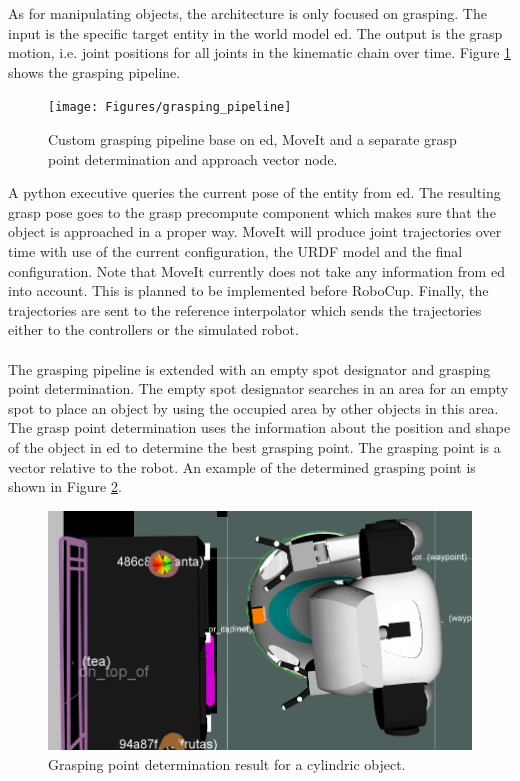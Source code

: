As for manipulating objects, the architecture is only focused on grasping. The input is the specific target entity in the world model \acrshort{ed}. The output is the grasp motion, i.e. joint positions for all joints in the kinematic chain over time. Figure \ref{fig:grasping_pipeline} shows the grasping pipeline.
\begin{figure}[h]
    \centering
	\texttt{[image: Figures/grasping\_pipeline]}
	\caption{Custom grasping pipeline base on \acrshort{ed}, MoveIt and a separate grasp point determination and approach vector node.}
	\label{fig:grasping_pipeline}
\end{figure}
A python executive queries the current pose of the entity from \acrshort{ed}. The resulting grasp pose goes to the grasp precompute component which makes sure that the object is approached in a proper way. MoveIt will produce joint trajectories over time with use of the current configuration, the URDF model and the final configuration. Note that MoveIt currently does not take any information from \acrshort{ed} into account. This is planned to be implemented before RoboCup. Finally, the trajectories are sent to the reference interpolator which sends the trajectories either to the controllers or the simulated robot.
\\\\
The grasping pipeline is extended with an empty spot designator and grasping point determination. The empty spot designator searches in an area for an empty spot to place an object by using the occupied area by other objects in this area.
\\
The grasp point determination uses the information about the position and shape of the object in \acrshort{ed} to determine the best grasping point. The grasping point is a vector relative to the robot. An example of the determined grasping point is shown in Figure \ref{fig:grasping_point_determination}.
 \begin{figure}[h]
    \centering
	\includegraphics[width = 0.8\linewidth]{Figures/grasp_point_determination}
	\caption{Grasping point determination result for a cylindric object.}
	\label{fig:grasping_point_determination}
\end{figure} 